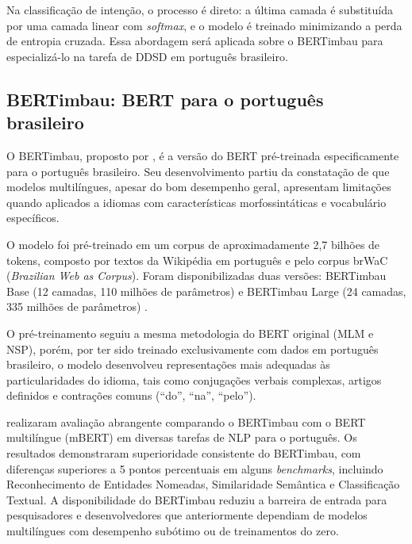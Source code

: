 \documentclass[
    12pt,                %
    openright,           %
    oneside,             %
    a4paper,             %
    english,             %
    brazil               %
]{abntex2}
\begin{document}
Na classificação de intenção, o processo é direto: a última camada é substituída por uma camada linear com \textit{softmax}, e o modelo é treinado minimizando a perda de entropia cruzada. Essa abordagem será aplicada sobre o BERTimbau para especializá-lo na tarefa de DDSD em português brasileiro.


\subsection{BERTimbau: BERT para o português brasileiro}

O BERTimbau, proposto por , é a versão do BERT pré-treinada especificamente para o português brasileiro. Seu desenvolvimento partiu da constatação de que modelos multilíngues, apesar do bom desempenho geral, apresentam limitações quando aplicados a idiomas com características morfossintáticas e vocabulário específicos.

O modelo foi pré-treinado em um corpus de aproximadamente 2,7 bilhões de tokens, composto por textos da Wikipédia em português e pelo corpus brWaC (\textit{Brazilian Web as Corpus}). Foram disponibilizadas duas versões: BERTimbau Base (12 camadas, 110 milhões de parâmetros) e BERTimbau Large (24 camadas, 335 milhões de parâmetros) \cite{Souza2020}.

O pré-treinamento seguiu a mesma metodologia do BERT original (MLM e NSP), porém, por ter sido treinado exclusivamente com dados em português brasileiro, o modelo desenvolveu representações mais adequadas às particularidades do idioma, tais como conjugações verbais complexas, artigos definidos e contrações comuns (``do'', ``na'', ``pelo'').

 realizaram avaliação abrangente comparando o BERTimbau com o BERT multilíngue (mBERT) em diversas tarefas de NLP para o português. Os resultados demonstraram superioridade consistente do BERTimbau, com diferenças superiores a 5 pontos percentuais em alguns \textit{benchmarks}, incluindo Reconhecimento de Entidades Nomeadas, Similaridade Semântica e Classificação Textual. A disponibilidade do BERTimbau reduziu a barreira de entrada para pesquisadores e desenvolvedores que anteriormente dependiam de modelos multilíngues com desempenho subótimo ou de treinamentos do zero.

\end{document}

